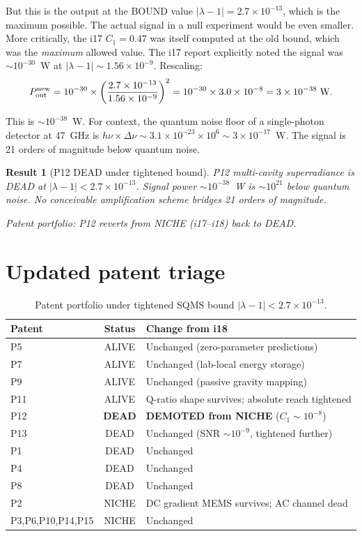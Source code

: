 \documentclass[11pt]{article}
\newtheorem{result}{Result}
\newcommand{\ee}[1]{\times 10^{#1}}
\newcommand{\lbone}{|\lambda - 1|}
\begin{document}
But this is the output at the BOUND value $\lbone = 2.7\ee{-13}$,
which is the maximum possible. The actual signal in a null experiment
would be even smaller. More critically, the i17 $C_1 = 0.47$ was
itself computed at the old bound, which was the \emph{maximum} allowed
value. The i17 report explicitly noted the signal was
$\sim 10^{-30}$~W at $\lbone \sim 1.56\ee{-9}$. Rescaling:
\begin{equation}
P_{\rm out}^{\rm new} = 10^{-30} \times
\left(\frac{2.7\ee{-13}}{1.56\ee{-9}}\right)^2
= 10^{-30} \times 3.0\ee{-8} = 3\ee{-38}\;\text{W}.
\end{equation}

This is $\sim 10^{-38}$~W. For context, the quantum noise floor of
a single-photon detector at 47~GHz is $h\nu \times \Delta\nu
\sim 3.1\ee{-23} \times 10^6 \sim 3\ee{-17}$~W. The signal is
21 orders of magnitude below quantum noise.

\begin{result}[P12 DEAD under tightened bound]
P12 multi-cavity superradiance is DEAD at $\lbone < 2.7\ee{-13}$.
Signal power $\sim 10^{-38}$~W is $\sim 10^{21}$ below quantum noise.
No conceivable amplification scheme bridges 21 orders of magnitude.

Patent portfolio: P12 reverts from NICHE (i17--i18) back to DEAD.
\end{result}

\section{Updated patent triage}

\begin{table}[H]
\centering
\caption{Patent portfolio under tightened SQMS bound $\lbone < 2.7\ee{-13}$.}
\begin{tabular}{@{}lcl@{}}
\toprule
Patent & Status & Change from i18 \\
\midrule
P5 & ALIVE & Unchanged (zero-parameter predictions) \\
P7 & ALIVE & Unchanged (lab-local energy storage) \\
P9 & ALIVE & Unchanged (passive gravity mapping) \\
P11 & ALIVE & Q-ratio shape survives; absolute reach tightened \\
P12 & \textbf{DEAD} & \textbf{DEMOTED from NICHE} ($C_1 \sim 10^{-8}$) \\
P13 & DEAD & Unchanged (SNR $\sim 10^{-9}$, tightened further) \\
P1 & DEAD & Unchanged \\
P4 & DEAD & Unchanged \\
P8 & DEAD & Unchanged \\
P2 & NICHE & DC gradient MEMS survives; AC channel dead \\
P3,P6,P10,P14,P15 & NICHE & Unchanged \\
\bottomrule
\end{tabular}
\end{table}
\end{document}
